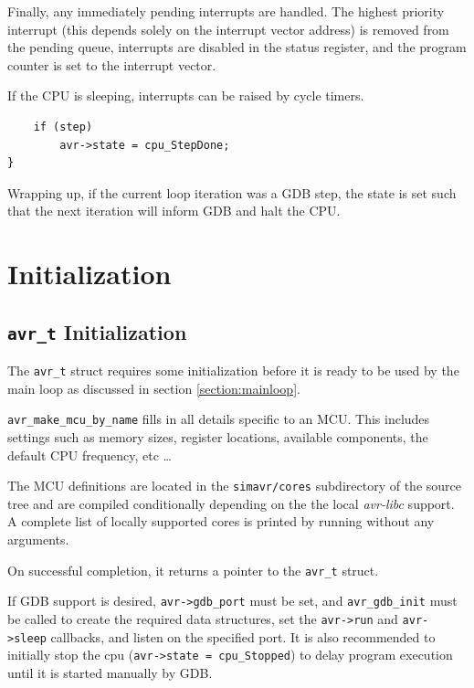 Finally, any immediately pending interrupts are handled. The highest priority
interrupt (this depends solely on the interrupt vector address) is removed from
the pending queue, interrupts are disabled in the status register, and the
program counter is set to the interrupt vector.

If the \ac{CPU} is sleeping, interrupts can be raised by cycle timers.

\begin{lstlisting}
    if (step)
        avr->state = cpu_StepDone;
}
\end{lstlisting}

Wrapping up, if the current loop iteration was a \ac{GDB} step, the state is set
such that the next iteration will inform \ac{GDB} and halt the \ac{CPU}.


\section{Initialization}

\subsection{\lstinline|avr_t| Initialization} \label{subsection:avr_t_initialization}

The \lstinline|avr_t| struct requires some initialization before it is
ready to be used by the main loop as discussed in section \ref{section:mainloop}.

\lstinline|avr_make_mcu_by_name| fills in all details specific to an \ac{MCU}. This
includes settings such as memory sizes, register locations, available components,
the default \ac{CPU} frequency, etc \ldots

The \ac{MCU} definitions are located in the \verb|simavr/cores| subdirectory of the \simavr
source tree and are compiled conditionally depending on the the local \emph{avr-libc}
support. A complete list of locally supported cores is printed by running \simavr
without any arguments.

On successful completion, it returns a pointer to the \lstinline|avr_t| struct.

If \ac{GDB} support is desired, \lstinline|avr->gdb_port| must be set, and
\lstinline|avr_gdb_init| must be called to create the required data structures,
set the \lstinline|avr->run| and \lstinline|avr->sleep| callbacks, and listen
on the specified port. It is also recommended to initially stop the cpu
(\lstinline|avr->state = cpu_Stopped|) to delay program execution until it
is started manually by \ac{GDB}.

